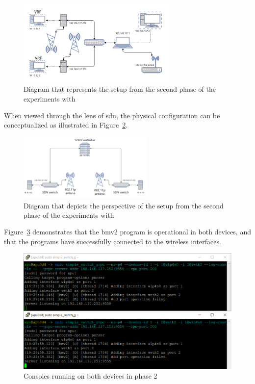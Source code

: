 \begin{figure}
	\centering
	\includegraphics[width=0.7\textwidth]{Chapters/Figures/tests/bmv2_phase_2/setup_diagram.PNG}
	\caption{Diagram that represents the setup from the second phase of the experiments with }
	\label{fig:exp2_phase2_diagram}
\end{figure}

When viewed through the lens of \gls{sdn}, the physical configuration can be conceptualized as illustrated in Figure~\ref{fig:exp2_phase2_sdn_diagram}.

\begin{figure}
	\centering
	\includegraphics[width=0.6\textwidth]{Chapters/Figures/tests/bmv2_phase_2/sdn_diagram.PNG}
	\caption{Diagram that depicts the  perspective of the setup from the second phase of the experiments with }
	\label{fig:exp2_phase2_sdn_diagram}
\end{figure}


Figure~\ref{fig:exp2_phase2_bmv2} demonstrates that the \gls{bmv2} program is operational in both devices, and that the programs have successfully connected to the wireless interfaces.

\begin{figure}
	\centering
	\includegraphics[width=\textwidth]{Chapters/Figures/tests/bmv2_phase_2/bmv2_running.PNG}
	\caption{Consoles running  on both devices in phase 2}
	\label{fig:exp2_phase2_bmv2}
\end{figure}


